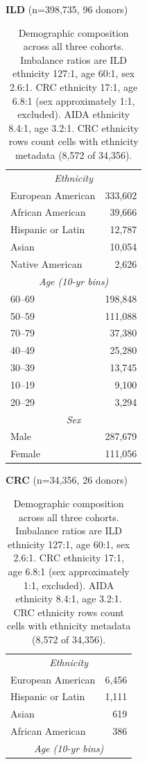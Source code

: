 \documentclass[sigconf]{acmart}
\begin{document}
\begin{table}[h]
\footnotesize
\centering
\caption{Demographic composition across all three cohorts. Imbalance ratios are ILD ethnicity 127:1, age 60:1, sex 2.6:1. CRC ethnicity 17:1, age 6.8:1 (sex approximately 1:1, excluded). AIDA ethnicity 8.4:1, age 3.2:1. CRC ethnicity rows count cells with ethnicity metadata (8{,}572 of 34{,}356).}
\label{tab:demo_all}
\begin{minipage}[t]{0.33\textwidth}
\centering
\textbf{ILD} (n=398{,}735, 96 donors)\\[2pt]
\begin{tabular}{@{}lr@{}}
\toprule
\multicolumn{2}{c}{\textit{Ethnicity}} \\
European American & 333{,}602 \\
African American  & 39{,}666 \\
Hispanic or Latin & 12{,}787 \\
Asian             & 10{,}054 \\
Native American   & 2{,}626 \\
\midrule
\multicolumn{2}{c}{\textit{Age (10-yr bins)}} \\
60--69 & 198{,}848 \\
50--59 & 111{,}088 \\
70--79 & 37{,}380 \\
40--49 & 25{,}280 \\
30--39 & 13{,}745 \\
10--19 & 9{,}100 \\
20--29 & 3{,}294 \\
\midrule
\multicolumn{2}{c}{\textit{Sex}} \\
Male   & 287{,}679 \\
Female & 111{,}056 \\
\bottomrule
\end{tabular}
\end{minipage}%
\hfill
\begin{minipage}[t]{0.33\textwidth}
\centering
\textbf{CRC} (n=34{,}356, 26 donors)\\[2pt]
\begin{tabular}{@{}lr@{}}
\toprule
\multicolumn{2}{c}{\textit{Ethnicity}} \\
European American & 6{,}456 \\
Hispanic or Latin & 1{,}111 \\
Asian             & 619 \\
African American  & 386 \\
\midrule
\multicolumn{2}{c}{\textit{Age (10-yr bins)}} \\

\end{tabular}
\end{minipage}
\end{table}
\end{document}
